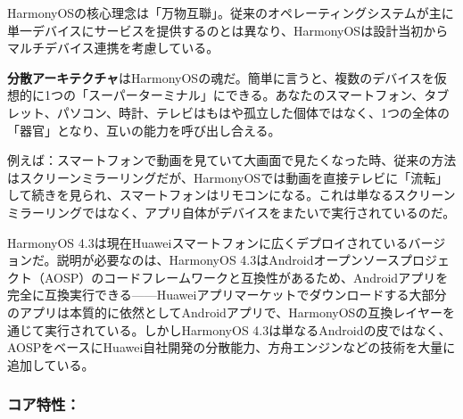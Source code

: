 


HarmonyOSの核心理念は「万物互聯」。従来のオペレーティングシステムが主に単一デバイスにサービスを提供するのとは異なり、HarmonyOSは設計当初からマルチデバイス連携を考慮している。

\textbf{分散アーキテクチャ}はHarmonyOSの魂だ。簡単に言うと、複数のデバイスを仮想的に1つの「スーパーターミナル」にできる。あなたのスマートフォン、タブレット、パソコン、時計、テレビはもはや孤立した個体ではなく、1つの全体の「器官」となり、互いの能力を呼び出し合える。

例えば：スマートフォンで動画を見ていて大画面で見たくなった時、従来の方法はスクリーンミラーリングだが、HarmonyOSでは動画を直接テレビに「流転」して続きを見られ、スマートフォンはリモコンになる。これは単なるスクリーンミラーリングではなく、アプリ自体がデバイスをまたいで実行されているのだ。


HarmonyOS 4.3は現在Huaweiスマートフォンに広くデプロイされているバージョンだ。説明が必要なのは、HarmonyOS 4.3はAndroidオープンソースプロジェクト（AOSP）のコードフレームワークと互換性があるため、Androidアプリを完全に互換実行できる——Huaweiアプリマーケットでダウンロードする大部分のアプリは本質的に依然としてAndroidアプリで、HarmonyOSの互換レイヤーを通じて実行されている。しかしHarmonyOS 4.3は単なるAndroidの皮ではなく、AOSPをベースにHuawei自社開発の分散能力、方舟エンジンなどの技術を大量に追加している。

\subsubsection*{コア特性：}

